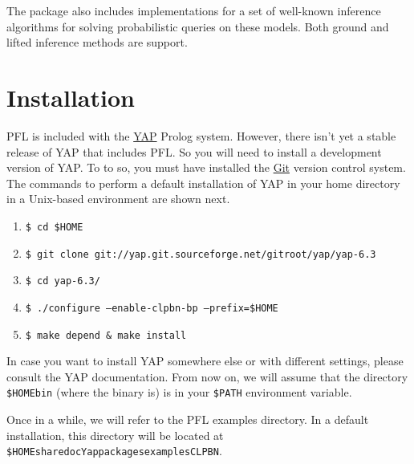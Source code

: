\documentclass{article}
\begin{document}
The package also includes implementations for a set of well-known inference algorithms for solving probabilistic queries on these models. Both ground and lifted inference methods are support.



\section{Installation}
PFL is included with the \href{http://www.dcc.fc.up.pt/~vsc/Yap/}{YAP} Prolog system. However, there isn't yet a stable release of YAP that includes PFL. So you will need to install a development version of YAP. To to so, you must have installed the \href{http://git-scm.com/}{Git} version control system. The commands to perform a default installation of YAP in your home directory in a Unix-based environment are shown next.

\begin{enumerate}
 \setlength\itemindent{-0.01cm}
 \item \texttt{\$ cd \$HOME}
 \item \texttt{\$ git clone git://yap.git.sourceforge.net/gitroot/yap/yap-6.3}
 \item \texttt{\$ cd yap-6.3/}
 \item \texttt{\$ ./configure --enable-clpbn-bp --prefix=\$HOME}
 \item \texttt{\$ make depend \& make install}
\end{enumerate}

In case you want to install YAP somewhere else or with different settings, please consult the YAP documentation. From now on, we will assume that the directory \texttt{\$HOME\pathsep bin} (where the binary is) is in your \texttt{\$PATH} environment variable.

\label{examples-directory}
Once in a while, we will refer to the PFL examples directory. In a default installation, this directory will be located at \texttt{\$HOME\pathsep share\pathsep doc\pathsep Yap\pathsep packages\pathsep examples\pathsep CLPBN}.



\end{document}
